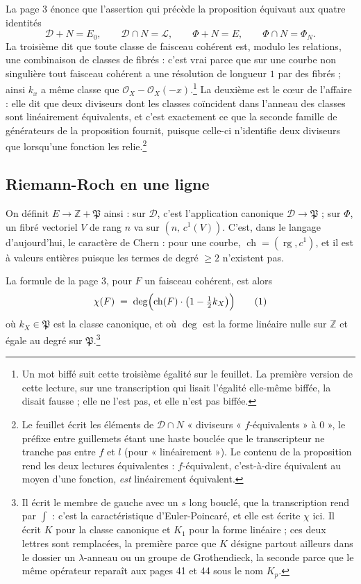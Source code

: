 \documentclass[11pt,a4paper]{article}
\begin{document}
La page 3 énonce que l'assertion qui précède la proposition équivaut aux quatre
identités
\[
  \mathcal{D} + N = E_{0}, \qquad \mathcal{D} \cap N = \mathcal{L},
  \qquad \Phi + N = E, \qquad \Phi \cap N = \Phi_{N} .
\]
La troisième dit que toute classe de faisceau cohérent est, modulo les
relations, une combinaison de classes de fibrés : c'est vrai parce que sur une
courbe non singulière tout faisceau cohérent a une résolution de longueur $1$
par des fibrés ; ainsi $k_{x}$ a même classe que $\mathcal{O}_{X} -
\mathcal{O}_{X}(-x)$.\footnote{Un mot biffé suit cette troisième égalité sur
le feuillet. La première version de cette lecture, sur une transcription qui
lisait l'égalité elle-même biffée, la disait fausse ; elle ne l'est pas, et
elle n'est pas biffée.} La deuxième est le cœur de l'affaire :
elle dit que deux diviseurs dont les classes coïncident dans l'anneau des
classes sont linéairement équivalents, et c'est exactement ce que la seconde
famille de générateurs de la proposition fournit, puisque celle-ci n'identifie
deux diviseurs que lorsqu'une fonction les relie.\footnote{Le feuillet écrit
les éléments de $\mathcal{D} \cap N$ « diviseurs « $f$-équivalents
» à $0$ », le préfixe entre guillemets étant une haste bouclée
que le transcripteur ne tranche pas entre $f$ et $l$ (pour
« linéairement »). Le contenu de la proposition rend les deux lectures
équivalentes : $f$-équivalent, c'est-à-dire équivalent au moyen d'une fonction,
\emph{est} linéairement équivalent.}

\subsection*{Riemann-Roch en une ligne}

On définit $E \to \mathbb{Z} + \mathfrak{P}$ ainsi : sur $\mathcal{D}$, c'est
l'application canonique $\mathcal{D} \to \mathfrak{P}$ ; sur $\Phi$, un fibré
vectoriel $V$ de rang $n$ va sur $(n,\, c^{1}(V))$. C'est, dans le langage
d'aujourd'hui, le caractère de Chern : pour une courbe,
$\operatorname{ch} = (\operatorname{rg}, c^{1})$, et il est à valeurs entières
puisque les termes de degré $\geqslant 2$ n'existent pas.

La formule de la page 3, pour $F$ un faisceau cohérent, est alors
\begin{equation*}
  \chi(F) \;=\; \deg\Bigl( \operatorname{ch}(F)\cdot
  \bigl(1 - \tfrac{1}{2}k_{X}\bigr) \Bigr)
  \tag{1}
\end{equation*}
où $k_{X} \in \mathfrak{P}$ est la classe canonique, et où $\deg$ est la forme
linéaire nulle sur $\mathbb{Z}$ et égale au degré sur
$\mathfrak{P}$.\footnote{Il écrit le membre de gauche avec un $s$ long bouclé,
que la transcription rend par $\int$ : c'est la caractéristique
d'Euler-Poincaré, et elle est écrite $\chi$ ici. Il écrit $K$ pour la classe
canonique et $K_{1}$ pour la forme linéaire ; ces deux lettres sont remplacées,
la première parce que $K$ désigne partout ailleurs dans le dossier un
$\lambda$-anneau ou un groupe de Grothendieck, la seconde parce que le même
opérateur reparaît aux pages 41 et 44 sous le nom $K_{p}$.}
\end{document}
